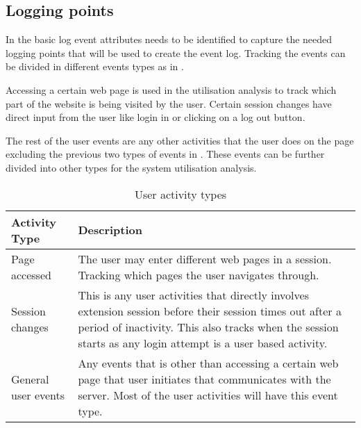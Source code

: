 \subsection{Logging points}
In  the basic log event attributes needs to be identified to capture the needed logging points that will be used to create the event log. Tracking the events can be divided in different events types as in . \par Accessing a certain web page is used in the utilisation analysis to track which part of the website is being visited by the user. Certain session changes have direct input from the user like login in or clicking on a log out button. \par The rest of the user events are any other activities that the user does on the page excluding the previous two types of events in . These events can be further divided into other types for the system utilisation analysis.

\begin{table}[!htb]
	\centering
	\small
	\caption[User activity types]
	{User activity types}
	\label{tbl:Ch2_User_ActivityTypes}
	\begin{tabularx}{\textwidth}{|l|X|}
		\hline \textbf{Activity Type} & \textbf{Description} \\
		\hline Page accessed & The user may enter different web pages in a session. Tracking which pages the user navigates through.\\
		\hline Session changes & This is any user activities that directly involves extension session before their session times out after a period of inactivity. This also tracks when the session starts as any login attempt is a user based activity.\\
		\hline General user events & Any events that is other than accessing a certain web page that user initiates that communicates with the server. Most of the user activities will have this event type.\\ 
		\hline
	\end{tabularx}
\end{table}

